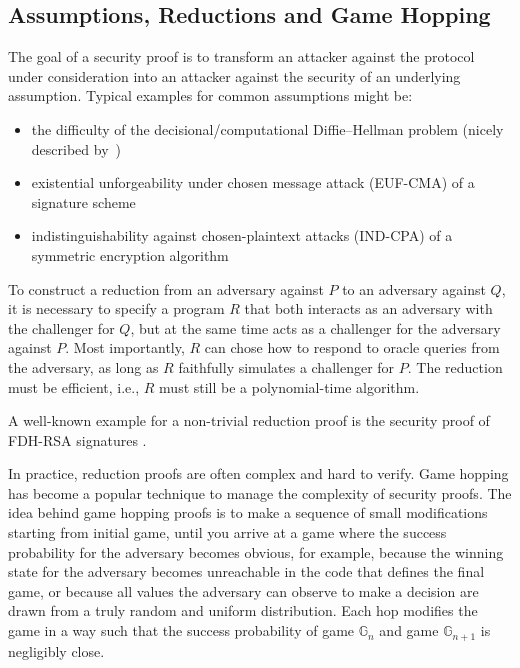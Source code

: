 \subsection{Assumptions, Reductions and Game Hopping}
The goal of a security proof is to transform an attacker against
the protocol under consideration into an attacker against the security
of an underlying assumption.  Typical examples for common assumptions might be:
\begin{itemize}
  \item the difficulty of the decisional/computational Diffie--Hellman problem (nicely described by~\cite{boneh1998decision})
  \item existential unforgeability under chosen message attack (EUF-CMA) of a signature scheme \cite{goldwasser1988digital}
  \item indistinguishability against chosen-plaintext attacks (IND-CPA) of a symmetric
    encryption algorithm \cite{bellare1998relations}
\end{itemize}

To construct a reduction from an adversary  against $P$ to an adversary
against $Q$, it is necessary to specify a program $R$ that both interacts as an
adversary with the challenger for $Q$, but at the same time acts as a
challenger for the adversary against $P$.  Most importantly, $R$ can chose how
to respond to oracle queries from the adversary, as long as $R$ faithfully
simulates a challenger for $P$.  The reduction must be efficient, i.e., $R$ must
still be a polynomial-time algorithm.

A well-known example for a non-trivial reduction proof is the security proof of
FDH-RSA signatures \cite{coron2000exact}.

In practice, reduction proofs are often complex and hard to verify.
Game hopping has become a popular technique to manage the complexity of
security proofs.  The idea behind game hopping proofs is to make a sequence of
small modifications starting from initial game, until you arrive at a game
where the success probability for the adversary becomes obvious, for example,
because the winning state for the adversary becomes unreachable in the code
that defines the final game, or because all values the adversary can observe to
make a decision are drawn from a truly random and uniform distribution.  Each
hop modifies the game in a way such that the success probability of game
$\mathbb{G}_n$ and game $\mathbb{G}_{n+1}$ is negligibly close.


